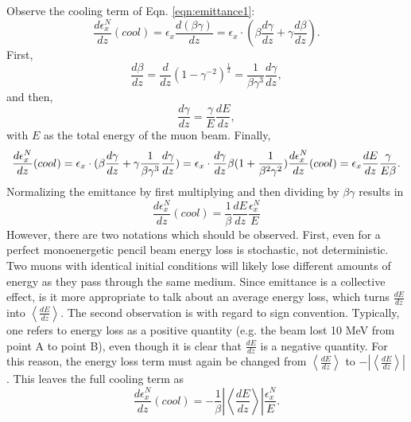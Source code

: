 Observe the cooling term of Eqn. \ref{eqn:emittance1}:
\begin{equation} \nonumber
\frac{d\epsilon_x^N}{dz}(cool)=\epsilon_x\frac{d(\beta\gamma)}{dz}=\epsilon_x\cdot(\beta\frac{d\gamma}{dz}+\gamma\frac{d\beta}{dz}).
\end{equation}
First,
\begin{equation} \nonumber
\frac{d\beta}{dz}=\frac{d}{dz}(1-\gamma^{-2})^{\frac{1}{2}}=\frac{1}{\beta\gamma^3}\frac{d\gamma}{dz},
\end{equation}
and then,
\begin{equation} \nonumber
\frac{d\gamma}{dz}=\frac{\gamma}{E}\frac{dE}{dz},
\end{equation}
with $E$ as the total energy of the muon beam. Finally,
\begin{equation} \nonumber
\frac{d\epsilon_x^N}{dz}(cool)=\epsilon_x\cdot(\beta\frac{d\gamma}{dz}+\gamma\frac{1}{\beta\gamma^3}\frac{d\gamma}{dz})=\epsilon_x\cdot\frac{d\gamma}{dz}\beta(1+\frac{1}{\beta^2\gamma^2}) \vspace*{12pt}
\frac{d\epsilon_x^N}{dz}(cool)=\epsilon_x\frac{dE}{dz}\frac{\gamma}{E\beta}.
\end{equation}
Normalizing the emittance by first multiplying and then dividing by $\beta\gamma$ results in
\begin{equation} \nonumber
\frac{d\epsilon_x^N}{dz}(cool)=\frac{1}{\beta}\frac{dE}{dz}\frac{\epsilon_x^N}{E}
\end{equation}
However, there are two notations which should be observed. First, even for a perfect monoenergetic pencil beam energy loss is stochastic, not deterministic. Two muons with identical initial conditions will likely lose different amounts of energy as they pass through the same medium. Since emittance is a collective effect, is it more appropriate to talk about an average energy loss, which turns $\frac{dE}{dz}$ into $\left<\frac{dE}{dz}\right>$. The second observation is with regard to sign convention. Typically, one refers to energy loss as a positive quantity (e.g. the beam lost 10 MeV from point A to point B), even though it is clear that $\frac{dE}{dz}$ is a negative quantity. For this reason, the energy loss term must again be changed from $\left<\frac{dE}{dz}\right>$ to  $-\left|\left<\frac{dE}{dz}\right>\right|$. This leaves the full cooling term as
\begin{equation}
\label{eqn:emittancecool}
\frac{d\epsilon_x^N}{dz}(cool)=-\frac{1}{\beta}\left| \left<\frac{dE}{dz}\right>\right| \frac{\epsilon_x^N}{E}.
\end{equation}

